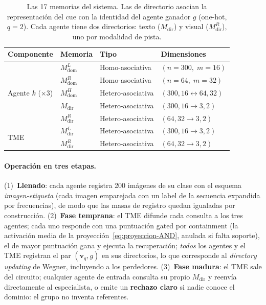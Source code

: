 \documentclass[11pt]{article}
\begin{document}
\begin{table}[H]
\centering
\caption{Las 17 memorias del sistema. Las de directorio asocian la
representación del cue con la identidad del agente ganador $g$ (one-hot,
$q{=}2$). Cada agente tiene dos directorios: texto ($M_{\mathrm{dir}}$) y
visual ($M^R_{\mathrm{dir}}$), uno por modalidad de pista.}
\label{tab:memorias}
\small
\begin{tabular}{@{}llll@{}}
\toprule
\textbf{Componente} & \textbf{Memoria} & \textbf{Tipo} & \textbf{Dimensiones} \\
\midrule
\multirow{5}{*}{Agente $k$ (×3)} &
  $M^L_{\mathrm{dom}}$ & Homo-asociativa & $(n{=}300,\; m{=}16)$ \\
& $M^R_{\mathrm{dom}}$ & Homo-asociativa & $(n{=}64,\; m{=}32)$ \\
& $M^H_{\mathrm{dom}}$ & Hetero-asociativa & $(300, 16 \leftrightarrow 64, 32)$ \\
& $M_{\mathrm{dir}}$   & Hetero-asociativa & $(300, 16 \to 3, 2)$ \\
& $M^R_{\mathrm{dir}}$ & Hetero-asociativa & $(64, 32 \to 3, 2)$ \\
\midrule
\multirow{2}{*}{TME} &
  $M^L_{\mathrm{dir}}$ & Hetero-asociativa & $(300, 16 \to 3, 2)$ \\
& $M^R_{\mathrm{dir}}$ & Hetero-asociativa & $(64, 32 \to 3, 2)$ \\
\bottomrule
\end{tabular}
\end{table}

\paragraph{Operación en tres etapas.}
(1)~\textbf{Llenado}: cada agente registra 200 imágenes de su clase con el
esquema \emph{imagen-etiqueta} (cada imagen emparejada con un label de la secuencia
expandida por frecuencias), de modo que las masas de registro quedan igualadas
por construcción.
(2)~\textbf{Fase temprana}: el TME difunde cada consulta a los tres agentes;
cada uno responde con una puntuación gated por containment (la activación media de la
proyección~\eqref{eq:proyeccion-AND}, anulada si falta soporte), el de mayor
puntuación gana y ejecuta la recuperación; \emph{todos} los agentes y el TME registran el
par $(\mathbf{v}_q, g)$ en sus directorios, lo que corresponde al
\textit{directory updating} de Wegner, incluyendo a los perdedores.
(3)~\textbf{Fase madura}: el TME sale del circuito; cualquier agente de entrada
consulta su propio $M_{\mathrm{dir}}$ y reenvía directamente al especialista, o
emite un \textbf{rechazo claro} si nadie conoce el dominio: el grupo no inventa
referentes.
\end{document}
